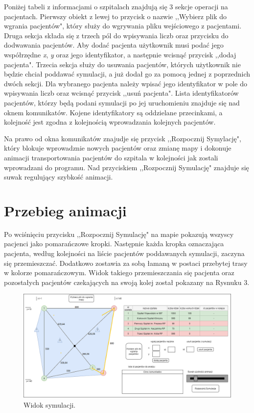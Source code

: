 \documentclass[10pt,a4paper]{article}
\begin{document}
Poniżej tabeli z informacjami o szpitalach znajdują się 3 sekcje operacji na pacjentach. Pierwszy obiekt z lewej to przycisk o nazwie ,,Wybierz plik do wgrania pacjentów", który służy do wgrywania pliku wejściowego z pacjentami. Druga sekcja składa się z trzech pól do wpisywania liczb oraz przycisku do dodwawania pacjentów. Aby dodać pacjenta użytkownik musi podać jego współrzędne \textit{x}, \textit{y} oraz jego identyfikator, a następnie wcisnąć przycisk ,,dodaj pacjenta". Trzecia sekcja służy do usuwania pacjentów, których użytkownik nie będzie chciał poddawać symulacji, a już dodał go za pomocą jednej z poprzednich dwóch sekcji. Dla wybranego pacjenta należy wpisać jego identyfikator w pole do wpisywania liczb oraz wcisnąć przycisk ,,usuń pacjenta". Lista identyfikatorów pacjentów, którzy będą podani symulacji po jej uruchomieniu znajduje się nad oknem komunikatów. Kojene identyfikatory są oddzielane przecinkami, a kolejność jest zgodna z kolejnością wprowadzania kolejnych pacjentów.

Na prawo od okna komunikatów znajudje się przycisk ,,Rozpocznij Symylację", który blokuje wprowadznie nowych pacjentów oraz zmianę mapy i dokonuje animacji transportowania pacjentów do szpitala w kolejności jak zostali wprowadzani do programu. Nad przyciskiem ,,Rozpocznij Symulację" znajduje się suwak regulujący szybkość animacji.

\section{Przebieg animacji}

Po wciśnięciu przycisku ,,Rozpocznij Symulację" na mapie pokazują wszyscy pacjenci jako pomarańczowe kropki. Następnie każda kropka oznaczająca pacjenta, według kolejności na liście pacjentów poddawanych symulacji, zaczyna się przemieszczać. Dodatkowo zostawia za sobą łamaną w postaci przebytej trasy w kolorze pomarańczowym. Widok takiego przemieszczania się pacjenta oraz pozostałych pacjentów czekających na swoją kolej został pokazany na Rysnuku 3.

\begin{figure}[h]
  \includegraphics[width=\linewidth]{./images/widok_symulacji.png}
  \caption{Widok symulacji.}
  \label{fig:GUIsym}
\end{figure}
\end{document}
